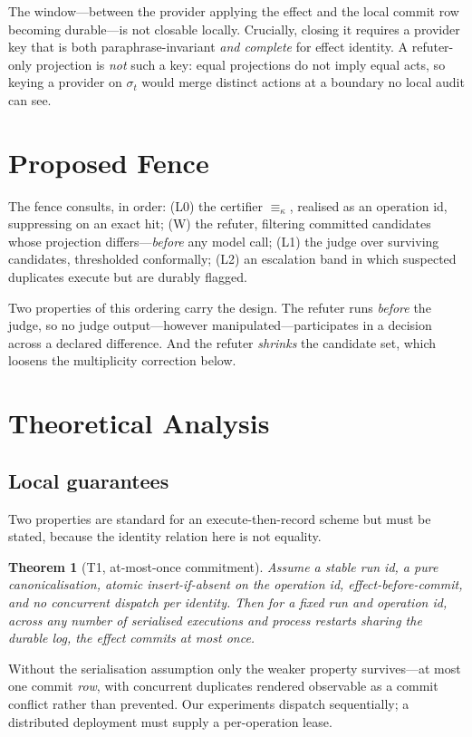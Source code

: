 \documentclass[10pt,twocolumn]{article}
\newtheorem{theorem}{Theorem}
\theoremstyle{definition}
\theoremstyle{remark}
\begin{document}
The window---between the provider applying the effect and the local commit row
becoming durable---is not closable locally. Crucially, closing it requires a
provider key that is both paraphrase-invariant \emph{and complete} for effect
identity. A refuter-only projection is \emph{not} such a key: equal projections
do not imply equal acts, so keying a provider on $\sigma_t$ would merge distinct
actions at a boundary no local audit can see.

\section{Proposed Fence}

The fence consults, in order: (L0) the certifier $\equiv_\kappa$, realised as an
operation id, suppressing on an exact hit; (W) the refuter, filtering committed
candidates whose projection differs---\emph{before} any model call; (L1) the
judge over surviving candidates, thresholded conformally; (L2) an escalation band
in which suspected duplicates execute but are durably flagged.

Two properties of this ordering carry the design. The refuter runs \emph{before}
the judge, so no judge output---however manipulated---participates in a decision
across a declared difference. And the refuter \emph{shrinks} the candidate set,
which loosens the multiplicity correction below.

\section{Theoretical Analysis}
\subsection{Local guarantees}

Two properties are standard for an execute-then-record scheme but must be stated,
because the identity relation here is not equality.

\begin{theorem}[T1, at-most-once commitment]
Assume a stable run id, a pure canonicalisation, atomic insert-if-absent on the
operation id, effect-before-commit, and no concurrent dispatch per identity.
Then for a fixed run and operation id, across any number of serialised
executions and process restarts sharing the durable log, the effect commits at
most once.
\end{theorem}

Without the serialisation assumption only the weaker property survives---at most
one commit \emph{row}, with concurrent duplicates rendered observable as a commit
conflict rather than prevented. Our experiments dispatch sequentially; a
distributed deployment must supply a per-operation lease.
\end{document}

